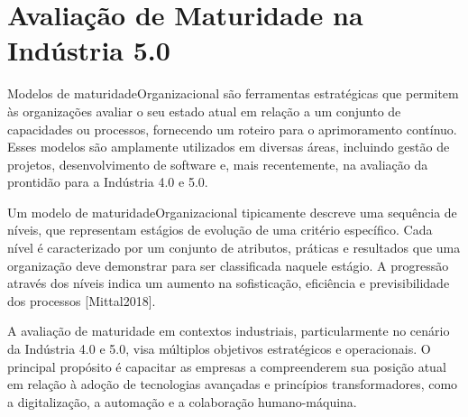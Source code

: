 
\chapter{Avaliação de Maturidade na Indústria 5.0}

Modelos de \gls{maturidadeOrganizacional} são ferramentas estratégicas que permitem às organizações avaliar o seu estado atual em relação a um conjunto de capacidades ou processos, fornecendo um roteiro para o aprimoramento contínuo. %
Esses modelos são amplamente utilizados em diversas áreas, incluindo gestão de projetos, desenvolvimento de software e, mais recentemente, na avaliação da prontidão para a Indústria 4.0 e 5.0. %

Um modelo de \gls{maturidadeOrganizacional} tipicamente descreve uma sequência de níveis, que representam estágios de evolução de uma critério específico.
Cada nível é caracterizado por um conjunto de atributos, práticas e resultados que uma organização deve demonstrar para ser classificada naquele estágio.
A progressão através dos níveis indica um aumento na sofisticação, eficiência e previsibilidade dos processos [Mittal2018].

A avaliação de maturidade em contextos industriais, particularmente no cenário da Indústria 4.0 e 5.0, visa múltiplos objetivos estratégicos e operacionais.
O principal propósito é capacitar as empresas a compreenderem sua posição atual em relação à adoção de tecnologias avançadas e princípios transformadores, como a digitalização, a automação e a colaboração humano-máquina. %

